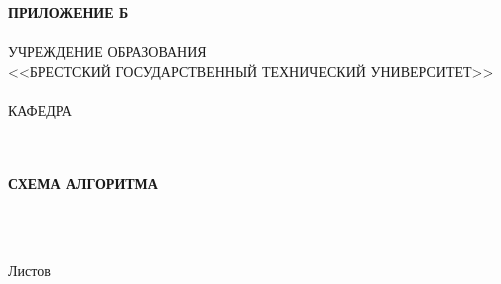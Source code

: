 \begin{center}
    \hspace{.6\textwidth}\textbf{ПРИЛОЖЕНИЕ Б}\\
    \hspace{0pt}\\
    УЧРЕЖДЕНИЕ ОБРАЗОВАНИЯ\\
    <<БРЕСТСКИЙ ГОСУДАРСТВЕННЫЙ ТЕХНИЧЕСКИЙ УНИВЕРСИТЕТ>>\\
    \hspace{0pt}\\
    КАФЕДРА \titlePageKafedra\\
\end{center}

\vfill

\begin{center}
    \titlePageTopic\\
    \hspace{0pt}\\
    \textbf{СХЕМА АЛГОРИТМА}\\
\end{center}

\vfill

\begin{center}
    \codeB\\
    \hspace{0pt}\\
    \begin{flushright}
        \begin{minipage}[t]{.5\textwidth}
            Листов \pageref{LastPage}\\
        \end{minipage}
    \end{flushright}
\end{center}

\vfill

